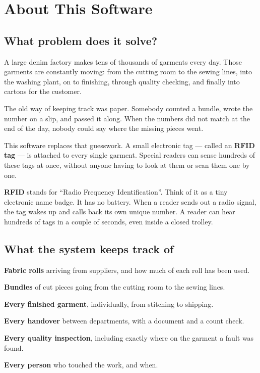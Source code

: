 \chapter{About This Software}

\section{What problem does it solve?}

A large denim factory makes tens of thousands of garments every day. Those
garments are constantly moving: from the cutting room to the sewing lines, into
the washing plant, on to finishing, through quality checking, and finally into
cartons for the customer.

The old way of keeping track was paper. Somebody counted a bundle, wrote the
number on a slip, and passed it along. When the numbers did not match at the end
of the day, nobody could say where the missing pieces went.

This software replaces that guesswork. A small electronic tag --- called an
\textbf{RFID tag} --- is attached to every single garment. Special readers can
sense hundreds of these tags at once, without anyone having to look at them or
scan them one by one.

\begin{plainwords}
\textbf{RFID} stands for ``Radio Frequency Identification''. Think of it as a
tiny electronic name badge. It has no battery. When a reader sends out a radio
signal, the tag wakes up and calls back its own unique number. A reader can hear
hundreds of tags in a couple of seconds, even inside a closed trolley.
\end{plainwords}

\section{What the system keeps track of}

\begin{bullets}
  \item \textbf{Fabric rolls} arriving from suppliers, and how much of each roll has been used.
  \item \textbf{Bundles} of cut pieces going from the cutting room to the sewing lines.
  \item \textbf{Every finished garment}, individually, from stitching to shipping.
  \item \textbf{Every handover} between departments, with a document and a count check.
  \item \textbf{Every quality inspection}, including exactly where on the garment a fault was found.
  \item \textbf{Every person} who touched the work, and when.
\end{bullets}


